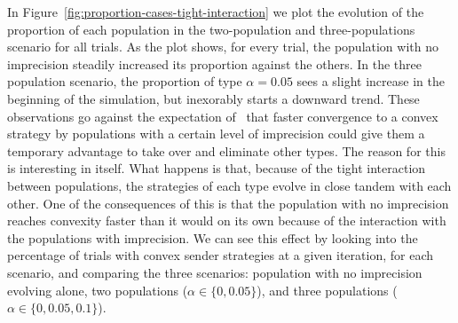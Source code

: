 \documentclass[a4paper]{article}
\begin{document}
In Figure~\ref{fig:proportion-cases-tight-interaction} we plot the evolution of the proportion of each population in the two-population and three-populations scenario for all trials.
As the plot shows, for every trial, the population with no imprecision steadily increased its proportion against the others.
In the three population scenario, the proportion of type $\alpha = 0.05$ sees a slight increase in the beginning of the simulation, but inexorably starts a downward trend.
These observations go against the expectation of~\textcite{franke_vagueness_2017} that faster convergence to a convex strategy by populations with a certain level of imprecision could give them a temporary advantage to take over and eliminate other types.
The reason for this is interesting in itself.
What happens is that, because of the tight interaction between populations, the strategies of each type evolve in close tandem with each other.
One of the consequences of this is that the population with no imprecision reaches convexity faster than it would on its own because of the interaction with the populations with imprecision.
We can see this effect by looking into the percentage of trials with convex sender strategies at a given iteration, for each scenario, and comparing the three scenarios: population with no imprecision evolving alone, two populations ($\alpha \in \{0, 0.05\}$), and three populations ($\alpha \in \{0, 0.05, 0.1\}$).
\end{document}
